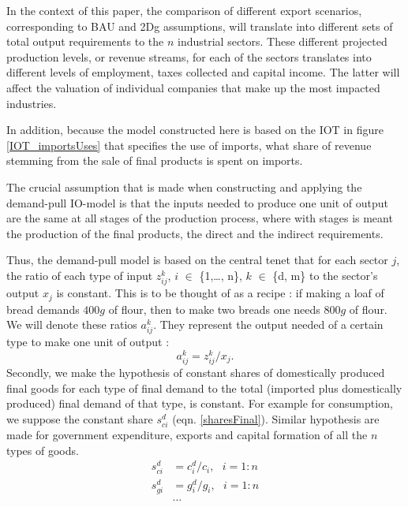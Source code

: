 \documentclass[12pt,english]{article}
\begin{document}
In the context of this paper, the comparison of different export scenarios, corresponding to BAU and 2Dg assumptions, will translate into different sets of total output requirements to the $n$ industrial sectors. These different projected production levels, or revenue streams, for each of the sectors translates into different levels of employment, taxes collected and capital income. The latter will affect the valuation of individual companies that make up the most impacted industries. 

In addition, because the model constructed here is based on the IOT in figure \ref{IOT_importsUses} that specifies the use of imports, what share of revenue stemming from the sale of final products is spent on imports.

The crucial assumption that is made when constructing and applying the demand-pull IO-model is that the inputs needed to produce one unit of output are the same at all stages of the production process, where with stages is meant the production of the final products, the direct and the indirect requirements.



Thus, the demand-pull model is based on the central tenet that for each sector $j$, the ratio of each type of input $z_{ij}^k$, $i$ $\in$ \{1,\ldots, n\}, $k$ $\in$ \{d, m\} to the sector's output $x_j$ is constant. This is to be thought of as a recipe : if making a loaf of bread demands $400g$ of flour, then to make two breads one needs $800g$ of flour. We will denote these ratios $a_{ij}^k$. They represent the output needed of a certain type to make one unit of output : 
\begin{equation}
a_{ij}^k = z_{ij}^k/x_j. \label{sharesIntermediate}
\end{equation}
Secondly, we make the hypothesis of constant shares of domestically produced final goods for each type of final demand to the %
total (imported plus domestically produced) final demand of that type, is constant. For example for consumption, we suppose the constant share $s^d_{ci}$ (eqn. \ref{sharesFinal}). Similar hypothesis are made for government expenditure, exports and capital formation of all the $n$ types of goods.
\begin{align}
s^d_{ci}&=c_i^d/c_i, \ \ \  i=1:n \label{sharesFinal}\\
s^d_{gi}&=g_i^d/g_i, \ \ \  i=1:n \nonumber\\
&\ldots \nonumber
\end{align} 
\end{document}
